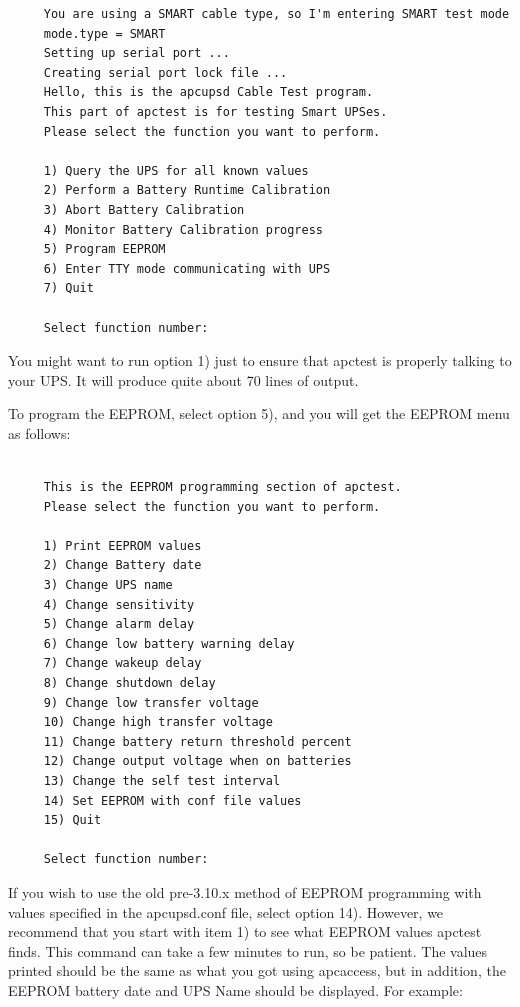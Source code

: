 {{{{{{{{{\begin{verbatim}
     You are using a SMART cable type, so I'm entering SMART test mode
     mode.type = SMART
     Setting up serial port ...
     Creating serial port lock file ...
     Hello, this is the apcupsd Cable Test program.
     This part of apctest is for testing Smart UPSes.
     Please select the function you want to perform.
     
     1) Query the UPS for all known values
     2) Perform a Battery Runtime Calibration
     3) Abort Battery Calibration
     4) Monitor Battery Calibration progress
     5) Program EEPROM
     6) Enter TTY mode communicating with UPS
     7) Quit
     
     Select function number:
\end{verbatim}
\normalsize

You might want to run option 1) just to ensure that apctest is properly
talking to your UPS. It will produce quite about 70 lines of output.  

To program the EEPROM, select option 5), and you will get the EEPROM menu as
follows: 

\footnotesize
\begin{verbatim}
     
     This is the EEPROM programming section of apctest.
     Please select the function you want to perform.
     
     1) Print EEPROM values
     2) Change Battery date
     3) Change UPS name
     4) Change sensitivity
     5) Change alarm delay
     6) Change low battery warning delay
     7) Change wakeup delay
     8) Change shutdown delay
     9) Change low transfer voltage
     10) Change high transfer voltage
     11) Change battery return threshold percent
     12) Change output voltage when on batteries
     13) Change the self test interval
     14) Set EEPROM with conf file values
     15) Quit
     
     Select function number:
\end{verbatim}
\normalsize

If you wish to use the old pre-3.10.x method of EEPROM programming with values
specified in the apcupsd.conf file, select option 14). However, we recommend
that you start with item 1) to see what EEPROM values apctest finds. This
command can take a few minutes to run, so be patient. The values printed
should be the same as what you got using apcaccess, but in addition, the
EEPROM battery date and UPS Name should be displayed. For example: 

\footnotesize
\begin{verbatim}
     

\end{verbatim}}}}}}}}}}
